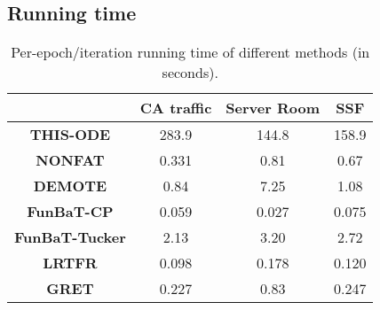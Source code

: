 \subsection{Running time}
\label{ap:running}
\begin{table}[h!]
\centering
\renewcommand{\arraystretch}{1.1}
\begin{tabular}{c|c|c|c}
\hline
 \textbf{} & \textbf{CA traffic} & \textbf{Server Room} & \textbf{SSF}  \\
\hline

\textbf{THIS-ODE} & 283.9 & 144.8 & 158.9  \\

\textbf{NONFAT} & 0.331 & 0.81 & 0.67  \\

\textbf{DEMOTE} & 0.84 & 7.25 & 1.08  \\
\textbf{FunBaT-CP} & 0.059 & 0.027 & 0.075  \\
\textbf{FunBaT-Tucker} & 2.13 & 3.20 & 2.72  \\
\textbf{LRTFR} & 0.098 & 0.178 & 0.120  \\
\textbf{GRET} & 0.227 & 0.83 & 0.247  \\
\hline
\end{tabular}
\caption{Per-epoch/iteration running time of different methods (in seconds).}
\label{Tab:runtime}
\end{table}








